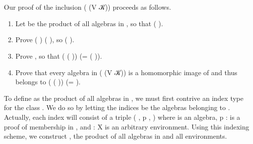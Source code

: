 \begin{code}
\AgdaSpace{}%
\AgdaSpace{}%
\AgdaSpace{}%
\AgdaSpace{}%
\AgdaSymbol{\{}\AgdaSpace{}%
\AgdaSymbol{=}\AgdaSpace{}%
\AgdaSymbol{\}}\AgdaSpace{}%
\AgdaSymbol{(}\AgdaSpace{}%
\AgdaSymbol{(}\AgdaSpace{}%
\AgdaSpace{}%
\AgdaSpace{}%
\AgdaSymbol{))}\<%
\\
%
\>[1]\AgdaSpace{}%
\AgdaSymbol{\{}\AgdaSpace{}%
\AgdaSymbol{=}\AgdaSpace{}%
\AgdaSymbol{\}}\AgdaSpace{}%
\AgdaSpace{}%
\AgdaSymbol{\{}\AgdaSymbol{\}}\AgdaSpace{}%
\AgdaSymbol{\{}\AgdaSymbol{\}}\AgdaSpace{}%
\AgdaSpace{}%
\AgdaSpace{}%
\AgdaSymbol{=}\AgdaSpace{}%
\AgdaSpace{}%
\AgdaSpace{}%
\AgdaSpace{}%
\<%
\\
\>[0]\<%
\end{code}

\noindent Our proof of the inclusion  ( (V 𝒦))    proceeds as follows.

\begin{enumerate}
\item Let  be the product of all algebras in  , so that    ( ).
\item Prove  ( )   ( ), so    ( ).
\item Prove   , so that    ( ( )) (=  ( )).
\item Prove that every algebra in  ( (V 𝒦)) is a homomorphic image of
 and thus belongs to  ( ( )) (=  ).
\end{enumerate}

To define  as the product of all algebras in  , we must first contrive
an index type for the class  .  We do so by letting the indices be the algebras
belonging to . Actually, each index will consist of a triple ( , \ab p ,
) where  is an algebra, \ab p :     is a proof of membership in ,
and  : \ab X   is an arbitrary environment.
Using this indexing scheme, we construct , the product of all algebras in 
and all environments.

